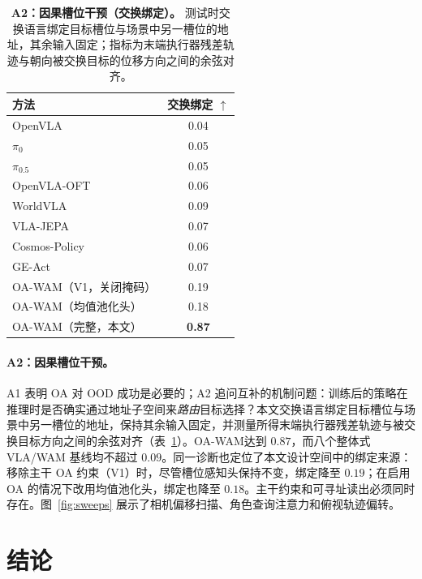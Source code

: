 \documentclass{article}
\newcommand{\method}{OA-WAM}
\newcommand{\B}[1]{\textbf{#1}}                            %
\newcommand{\hl}[1]{\cellcolor{ourshl}#1}                  %
\begin{document}
\begin{table}
\centering

\caption{\textbf{A2：因果槽位干预（交换绑定）。} 测试时交换语言绑定目标槽位与场景中另一槽位的地址，其余输入固定；指标为末端执行器残差轨迹与朝向被交换目标的位移方向之间的余弦对齐。}
\label{tab:abl-intervention}
\setlength{\tabcolsep}{4pt}
\renewcommand{\arraystretch}{1.05}
\begin{tabular}{lc}
\toprule
方法 & 交换绑定 $\uparrow$ \\
\midrule
OpenVLA~\citep{openvla}             & 0.04 \\
$\pi_0$~\citep{pi0}                 & 0.05 \\
$\pi_{0.5}$~\citep{pi05}            & 0.05 \\
OpenVLA-OFT~\citep{openvlaoft}      & 0.06 \\
WorldVLA~\citep{worldvla}           & 0.09 \\
VLA-JEPA~\citep{vlajepa}            & 0.07 \\
Cosmos-Policy~\citep{cosmospolicy}  & 0.06 \\
GE-Act~\citep{geact}                & 0.07 \\
\midrule
\method{}（V1，关闭掩码）            & 0.19 \\
\method{}（均值池化头）          & 0.18 \\
\hl{\method{}（完整，本文）}         & \hl{\B{0.87}} \\
\bottomrule
\end{tabular}

\end{table}


\paragraph{A2：因果槽位干预。}
A1 表明 OA 对 OOD 成功是必要的；A2 追问互补的机制问题：训练后的策略在推理时是否确实通过地址子空间来\emph{路由}目标选择？本文交换语言绑定目标槽位与场景中另一槽位的地址，保持其余输入固定，并测量所得末端执行器残差轨迹与被交换目标方向之间的余弦对齐（表~\ref{tab:abl-intervention}）。\method{}达到 $0.87$，而八个整体式 VLA/WAM 基线均不超过 $0.09$。同一诊断也定位了本文设计空间中的绑定来源：移除主干 OA 约束（V1）时，尽管槽位感知头保持不变，绑定降至 $0.19$；在启用 OA 的情况下改用均值池化头，绑定也降至 $0.18$。主干约束和可寻址读出必须同时存在。图~\ref{fig:sweeps} 展示了相机偏移扫描、角色查询注意力和俯视轨迹偏转。


\section{结论}
\end{document}
